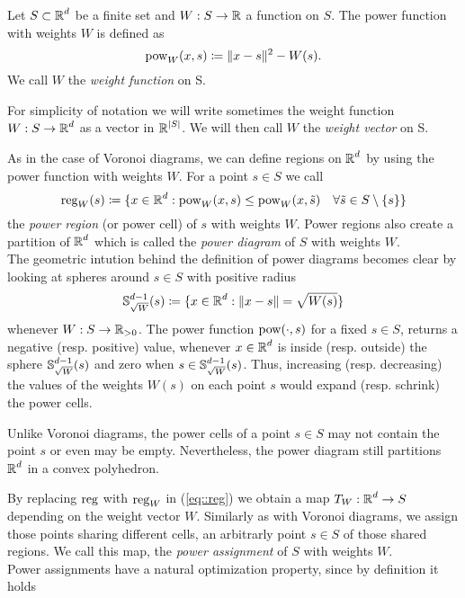 \documentclass[
     12pt,         %
     a4paper,      %
     BCOR=10mm,     %
     DIV=14,        %
     ]{scrreprt}
\begin{document}
    \begin{defi}      
        Let $S\subset \operatorname{\mathbb{R}}^d$ be a finite set and $W: S \to \operatorname{\mathbb{R}} $ a function on $S$. The power function with weights $W$ is defined as
        \[ \operatorname{pow}_W(x,s) \coloneqq \|x-s\|^2 - W(s). \]
        We call $W$ the \textit{weight function} on S.
    \end{defi}
    \begin{rem}
        For simplicity of notation we will write sometimes the weight function $W:S\to\operatorname{\mathbb{R}}^d$ as a vector in $\operatorname{\mathbb{R}}^{|S|}$.  We will then call $W$ the \textit{weight vector} on S.
    \end{rem}
    As in the case of Voronoi diagrams, we can define regions on $\operatorname{\mathbb{R}}^d$ by using the power function with weights $W$.
    For a point $s\in S$ we call 
    \[\operatorname{reg}_W(s) \coloneqq \{x \in \operatorname{\mathbb{R}}^d : \operatorname{pow}_W(x,s) \le \operatorname{pow}_W(x,\tilde s) \quad  \forall \tilde s \in S\setminus \{s\} \} \]
    the \textit{power region} (or power cell) of $s$ with weights $W$. Power regions also create a partition of $\operatorname{\mathbb{R}}^d$ which is called the \textit{power diagram} of $S$ with weights $W$. \\
    The geometric intution behind the definition of power diagrams becomes clear by looking at spheres around $s\in S$ with positive radius %
    \[\operatorname{\mathbb{S}}_{\sqrt W}^{d-1}(s) \coloneqq \{x \in \operatorname{\mathbb{R}}^d : \| x-s \| = \sqrt{W(s)} \} \]
    whenever $W : S \to \operatorname{\mathbb{R}}_{>0} $. The power function $\operatorname{pow}(\cdot, s)$ for a fixed $s\in S$, returns a negative (resp. positive) value, whenever $x\in \operatorname{\mathbb{R}}^d$ is inside 
    (resp. outside) the sphere $\operatorname{\mathbb{S}}_{\sqrt W}^{d-1}(s)$ and zero when $s\in \operatorname{\mathbb{S}}_{\sqrt W}^{d-1}(s)$. Thus, increasing (resp. decreasing) the values of the weights $W(s)$ on each point $s$ would expand (resp. schrink)
    the power cells. 
    \begin{rem}
        Unlike Voronoi diagrams, the power cells of a point $s\in S$ may not contain the point $s$ or even may be empty. Nevertheless, the power diagram still partitions $\operatorname{\mathbb{R}}^d$ in 
        a convex polyhedron.
    \end{rem}
    By replacing $\operatorname{reg}$ with $\operatorname{reg}_W$ in (\ref{eq::reg}) we obtain a map $T_W: \operatorname{\mathbb{R}}^d \to S$ depending on the weight vector $W$.  Similarly as with Voronoi diagrams, we assign those points sharing
    different cells, an arbitrarly point $s\in S$ of those shared regions. We call this map, the \textit{power assignment} of $S$ with weights $W$. \\
    Power assignments have a natural optimization property, since by definition it holds 
\end{document}
